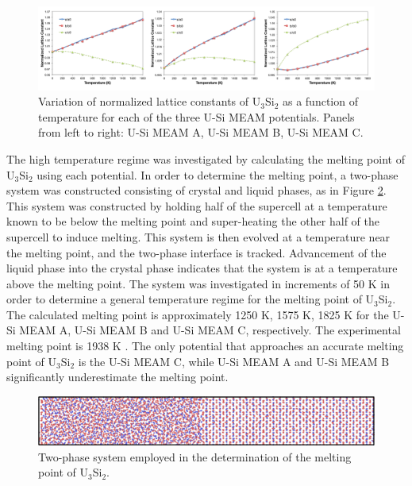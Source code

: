 \documentclass[review]{elsarticle}
\begin{document}
\begin{figure}[hbt]
	\centering
	\includegraphics[width=\textwidth]{latticetemp3.png}
    \caption{Variation of normalized lattice constants of U$_{3}$Si$_{2}$ as a function of temperature for each of the three U-Si MEAM potentials.  Panels from left to right: U-Si MEAM A, U-Si MEAM B, U-Si MEAM C.}\label{fig:latticetemp}
\end{figure}

The high temperature regime was investigated by calculating the melting point of U$_{3}$Si$_{2}$ using each potential.  In order to determine the melting point, a two-phase system was constructed consisting of crystal and liquid phases, as in Figure \ref{fig:twophase}.  This system was constructed by holding half of the supercell at a temperature known to be below the melting point and super-heating the other half of the supercell to induce melting.  This system is then evolved at a temperature near the melting point, and the two-phase interface is tracked.  Advancement of the liquid phase into the crystal phase indicates that the system is at a temperature above the melting point.  The system was investigated in increments of 50 K in order to determine a general temperature regime for the melting point of U$_{3}$Si$_{2}$.  The calculated melting point is approximately 1250 K, 1575 K, 1825 K for the U-Si MEAM A, U-Si MEAM B and U-Si MEAM C, respectively.  The experimental melting point is 1938 K \cite{berche2009}.  The only potential that approaches an accurate melting point of U$_{3}$Si$_{2}$ is the U-Si MEAM C, while U-Si MEAM A and U-Si MEAM B significantly underestimate the melting point.  

\begin{figure}[hbt]
	\centering
	\includegraphics[width=\textwidth]{two_phase2.png}
    \caption{Two-phase system employed in the determination of the melting point of U$_{3}$Si$_{2}$.}\label{fig:twophase}
\end{figure}
\end{document}
